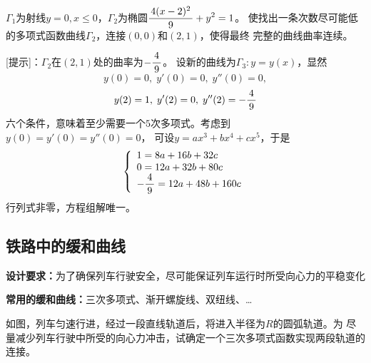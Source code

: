 \egz $\Gamma_1$为射线$y=0,x\leq0$，$\Gamma_2$为椭圆$\displaystyle\frac{\,{4(x-2)^2}\,}{\,{9}\,}+y^2=1$。
使找出一条次数尽可能低的多项式函数曲线$\Gamma_2$，连接$(0,0)$和$(2,1)$，使得最终
完整的曲线曲率连续。

[提示]：$\Gamma_2$在$(2,1)$处的曲率为$-\displaystyle\frac{\,{4}\,}{\,{9}\,}$。
设新的曲线为$\Gamma_3:y=y(x)$，显然
$$y(0)=0,\;y'(0)=0,\;y''(0)=0,$$
$$y(2)=1,\;y'(2)=0,\;y''(2)=-\displaystyle\frac{\,{4}\,}{\,{9}\,}$$
六个条件，意味着至少需要一个$5$次多项式。考虑到$y(0)=y'(0)=y''(0)=0$，
可设$y=ax^3+bx^4+cx^5$，于是
$$
\left\{
\begin{array}{l}
1=8a+16b+32c\\
0=12a+32b+80c\\
-\displaystyle\frac{\,{4}\,}{\,{9}\,}=12a+48b+160c
\end{array}
\right.
$$
行列式非零，方程组解唯一。

\subsection{铁路中的缓和曲线}

\begin{center}
\end{center}

{\bf 设计要求：}为了确保列车行驶安全，尽可能保证列车运行时所受向心力的平稳变化

{\bf 常用的缓和曲线：}三次多项式、渐开螺旋线、双纽线、\ldots

\egz 如图，列车匀速行进，经过一段直线轨道后，将进入半径为$R$的圆弧轨道。为
尽量减少列车行驶中所受的向心力冲击，试确定一个三次多项式函数实现两段轨道的连接。

